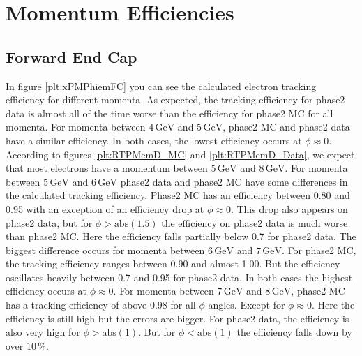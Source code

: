 \documentclass[a4paper,11pt,twosided,final,german,openbib,pdftex,listof=totoc,bibliography=totoc]{scrbook}
\begin{document}
\section{Momentum Efficiencies}


\subsection{Forward End Cap}
\label{sec:MFC}


In figure \ref{plt:xPMPhiemFC} you can see the calculated electron tracking efficiency for different momenta. As expected, the tracking efficiency for phase2 data is almost all of the time worse than the efficiency for phase2 MC for all momenta. For momenta between $4\,\textrm{GeV}$ and $5\,\textrm{GeV}$, phase2 MC and phase2 data have a similar efficiency. In both cases, the lowest efficiency occurs at $\phi \approx 0$. According to figures \ref{plt:RTPMemD_MC} and \ref{plt:RTPMemD_Data}, we expect that most electrons have a momentum between $5\,\textrm{GeV}$ and $8\,\textrm{GeV}$. For momenta between $5\,\textrm{GeV}$ and $6\,\textrm{GeV}$ phase2 data and phase2 MC have some differences in the calculated tracking efficiency. Phase2 MC has an efficiency between 0.80 and 0.95 with an exception of an efficiency drop at $\phi \approx 0$. This drop also appears on phase2 data, but for $\phi > \textrm{abs}(1.5)$ the efficiency on phase2 data is much worse than phase2 MC. Here the efficiency falls partially below 0.7 for phase2 data.
 The biggest difference occurs for momenta between $6\,\textrm{GeV}$ and $7\,\textrm{GeV}$. For phase2 MC, the tracking efficiency ranges between 0.90 and almost 1.00. But the efficiency oscillates heavily between 0.7 and 0.95 for phase2 data. In both cases the highest efficiency occurs at $\phi \approx 0$. For momenta between $7\,\textrm{GeV}$ and $8\,\textrm{GeV}$, phase2 MC has a tracking efficiency of above 0.98 for all $\phi$ angles. Except for $\phi \approx 0$. Here the efficiency is still high but the errors are bigger. For phase2 data, the efficiency is also very high for $\phi >\textrm{abs}(1)$. But for $\phi < \textrm{abs}(1)$ the efficiency falls down by over $10\,\%$.
\end{document}
